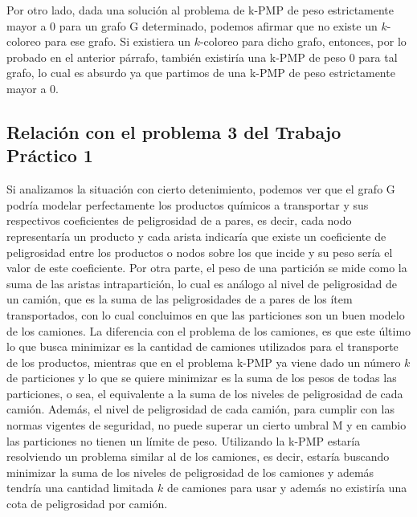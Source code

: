 Por otro lado, dada una solución al problema de k-PMP de peso estrictamente mayor a $0$ para un grafo G determinado, podemos afirmar que no existe un $k$-coloreo para ese grafo. Si existiera un $k$-coloreo para dicho grafo, entonces, por lo probado en el anterior párrafo, también existiría una k-PMP de peso $0$ para tal grafo, lo cual es absurdo ya que partimos de una k-PMP de peso estrictamente mayor a $0$.

\subsection{Relación con el problema 3 del Trabajo Práctico 1}

Si analizamos la situación con cierto detenimiento, podemos ver que el grafo G podría modelar perfectamente los productos químicos a transportar y sus respectivos coeficientes de peligrosidad de a pares, es decir, cada nodo representaría un producto y cada arista indicaría que existe un coeficiente de peligrosidad entre los productos o nodos sobre los que incide y su peso sería el valor de este coeficiente. Por otra parte, el peso de una partición se mide como la suma de las aristas intrapartición, lo cual es análogo al nivel de peligrosidad de un camión, que es la suma de las peligrosidades de a pares de los ítem transportados, con lo cual concluimos en que las particiones son un buen modelo de los camiones. La diferencia con el problema de los camiones, es que este último lo que busca minimizar es la cantidad de camiones utilizados para el transporte de los productos, mientras que en el problema k-PMP ya viene dado un número $k$ de particiones y lo que se quiere minimizar es la suma de los pesos de todas las particiones, o sea, el equivalente a la suma de los niveles de peligrosidad de cada camión. Además, el nivel de peligrosidad de cada camión, para cumplir con las normas vigentes de seguridad, no puede superar un cierto umbral M y en cambio las particiones no tienen un límite de peso. Utilizando la k-PMP estaría resolviendo un problema similar al de los camiones, es decir, estaría buscando minimizar la suma de los niveles de peligrosidad de los camiones y además tendría una cantidad limitada $k$ de camiones para usar y además no existiría una cota de peligrosidad por camión.